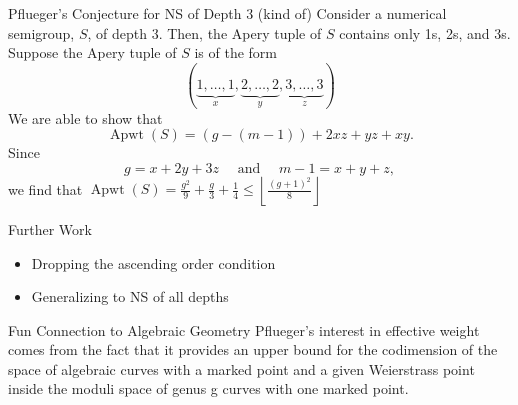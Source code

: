 \documentclass{beamer}
\DeclareMathOperator{\Apwt}{Apwt}
\begin{document}
\begin{frame}{Pflueger's Conjecture for NS of Depth 3 (kind of)}
    Consider a numerical semigroup, $S$, of depth 3. Then, the Apery tuple of $S$ contains only 1s, 2s, and 3s. Suppose the Apery tuple of $S$ is of the form 
    \[(\underbrace{1,\dots,1}_{x},\underbrace{2,\dots,2}_{y},\underbrace{3,\dots,3}_{z})\]
We are able to show that
    \[\Apwt(S)=(g-(m-1))+2xz+yz+xy.\]
Since 
\[g=x+2y+3z\quad\text{ and }\quad m-1=x+y+z,\]
we find that $\Apwt(S)=\frac{g^2}{9}+\frac{g}{3}+\frac{1}{4}\leq \left\lfloor\frac{(g+1)^2}{8} \right\rfloor$
\end{frame}

\begin{frame}{Further Work}
    \begin{itemize}
        \item Dropping the ascending order condition
        \item Generalizing to NS of all depths
    \end{itemize}
\end{frame}

\begin{frame}{Fun Connection to Algebraic Geometry}
Pflueger's interest in effective weight comes from the fact that it provides an upper bound for the codimension of the space of algebraic curves with a marked point and a given Weierstrass point inside the moduli space of genus g curves with one marked point.
\end{frame}
\end{document}
